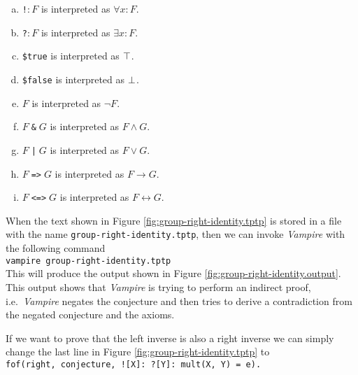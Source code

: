 \begin{enumerate}[(a)]
\item \texttt{!\;[X]}$:F$ is interpreted as $\forall x: F$.
\item \texttt{?\;[X]}$:F$ is interpreted as $\exists x:F$.
\item \texttt{\$true} is interpreted as $\top$.
\item \texttt{\$false} is interpreted as $\bot$.
\item \texttt{}$F$ is interpreted as $\neg F$.
\item $F\;$\texttt{\&}$\;G$ is interpreted as $F \wedge G$.
\item $F\;$\texttt{|}$\;G$ is interpreted as $F \vee G$.
\item $F\;$\texttt{=>}$\;G$ is interpreted as $F \rightarrow G$.
\item $F\;$\texttt{<=>}$\;G$ is interpreted as $F \leftrightarrow G$.
\end{enumerate}
When the text shown in Figure \ref{fig:group-right-identity.tptp} is stored in a file with the name \texttt{group-right-identity.tptp},
then we can invoke \textsl{Vampire} with the following command
\\[0.2cm]
\hspace*{1.3cm}
\texttt{vampire group-right-identity.tptp}
\\[0.2cm]
This will produce the output shown in Figure \ref{fig:group-right-identity.output}.  This output shows that
\textsl{Vampire} is trying to perform an indirect proof, i.e.~\textsl{Vampire} negates the conjecture and then
tries to derive a contradiction from the negated conjecture and the axioms.

If we want to prove that the left inverse is also a right inverse we can simply change the last line in Figure
\ref{fig:group-right-identity.tptp} to
\\[0.2cm]
\hspace*{1.3cm}
\texttt{fof(right, conjecture, ![X]: ?[Y]: mult(X, Y) = e).}


